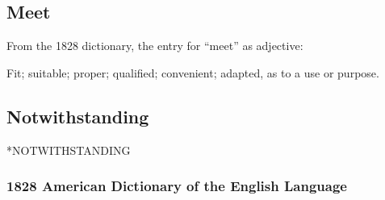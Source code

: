 	\subsection{Meet} %
		\label{MEET}
		
		From the 1828 dictionary, the entry for ``meet'' as adjective:
		
			\begin{compactitem}
				\item Fit; suitable; proper; qualified; convenient; adapted, as to a use or purpose.
			\end{compactitem}


	\subsection{Notwithstanding} *NOTWITHSTANDING
		\label{NOTWITHSTANDING}
		
		\subsubsection{1828 American Dictionary of the English Language}
		
